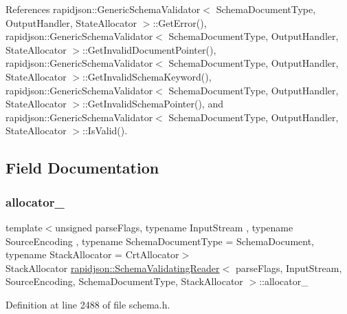 References rapidjson\+::\+Generic\+Schema\+Validator$<$ Schema\+Document\+Type, Output\+Handler, State\+Allocator $>$\+::\+Get\+Error(), rapidjson\+::\+Generic\+Schema\+Validator$<$ Schema\+Document\+Type, Output\+Handler, State\+Allocator $>$\+::\+Get\+Invalid\+Document\+Pointer(), rapidjson\+::\+Generic\+Schema\+Validator$<$ Schema\+Document\+Type, Output\+Handler, State\+Allocator $>$\+::\+Get\+Invalid\+Schema\+Keyword(), rapidjson\+::\+Generic\+Schema\+Validator$<$ Schema\+Document\+Type, Output\+Handler, State\+Allocator $>$\+::\+Get\+Invalid\+Schema\+Pointer(), and rapidjson\+::\+Generic\+Schema\+Validator$<$ Schema\+Document\+Type, Output\+Handler, State\+Allocator $>$\+::\+Is\+Valid().



\subsection{Field Documentation}
\mbox{\label{classrapidjson_1_1_schema_validating_reader_a115cbcbdbd933a36883934eb49cb4576}} 
\subsubsection{\texorpdfstring{allocator\_}{allocator\_}}
{\footnotesize\ttfamily template$<$unsigned parse\+Flags, typename Input\+Stream , typename Source\+Encoding , typename Schema\+Document\+Type  = Schema\+Document, typename Stack\+Allocator  = Crt\+Allocator$>$ \\
Stack\+Allocator \mbox{\hyperlink{classrapidjson_1_1_schema_validating_reader}{rapidjson\+::\+Schema\+Validating\+Reader}}$<$ parse\+Flags, Input\+Stream, Source\+Encoding, Schema\+Document\+Type, Stack\+Allocator $>$\+::allocator\+\_\+\hspace{0.3cm}{\ttfamily [private]}}



Definition at line 2488 of file schema.\+h.

